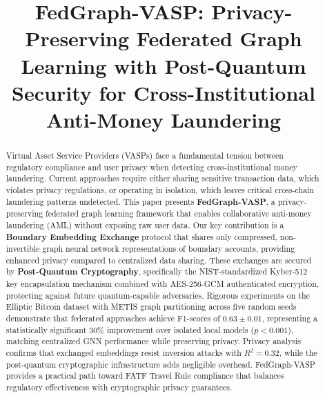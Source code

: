 \documentclass[conference]{IEEEtran}
\begin{document}
\title{FedGraph-VASP: Privacy-Preserving Federated Graph Learning with Post-Quantum Security for Cross-Institutional Anti-Money Laundering}


\maketitle

\begin{abstract}
Virtual Asset Service Providers (VASPs) face a fundamental tension between regulatory compliance and user privacy when detecting cross-institutional money laundering. Current approaches require either sharing sensitive transaction data, which violates privacy regulations, or operating in isolation, which leaves critical cross-chain laundering patterns undetected. This paper presents \textbf{FedGraph-VASP}, a privacy-preserving federated graph learning framework that enables collaborative anti-money laundering (AML) without exposing raw user data. Our key contribution is a \textbf{Boundary Embedding Exchange} protocol that shares only compressed, non-invertible graph neural network representations of boundary accounts, providing enhanced privacy compared to centralized data sharing. These exchanges are secured by \textbf{Post-Quantum Cryptography}, specifically the NIST-standardized Kyber-512 key encapsulation mechanism combined with AES-256-GCM authenticated encryption, protecting against future quantum-capable adversaries. Rigorous experiments on the Elliptic Bitcoin dataset with METIS graph partitioning across five random seeds demonstrate that federated approaches achieve F1-scores of $0.63 \pm 0.01$, representing a statistically significant 30\% improvement over isolated local models ($p < 0.001$), matching centralized GNN performance while preserving privacy. Privacy analysis confirms that exchanged embeddings resist inversion attacks with $R^2 = 0.32$, while the post-quantum cryptographic infrastructure adds negligible overhead. FedGraph-VASP provides a practical path toward FATF Travel Rule compliance that balances regulatory effectiveness with cryptographic privacy guarantees.
\end{abstract}
\end{document}
